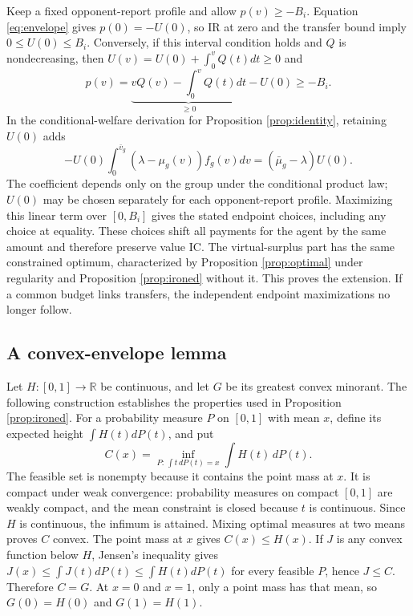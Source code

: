\documentclass[11pt]{article}
\begin{document}
Keep a fixed opponent-report profile and allow $p(v)\ge-B_i$. Equation \eqref{eq:envelope} gives $p(0)=-U(0)$, so IR at zero and the transfer bound imply $0\le U(0)\le B_i$. Conversely, if this interval condition holds and $Q$ is nondecreasing, then $U(v)=U(0)+\int_0^vQ(t)dt\ge0$ and
\[
p(v)=\underbrace{vQ(v)-\int_0^vQ(t)dt}_{\ge0}-U(0)\ge-B_i.
\]
In the conditional-welfare derivation for Proposition \ref{prop:identity}, retaining $U(0)$ adds
\[
-U(0)\int_0^{\bar v_g}(\lambda-\mu_g(v))f_g(v)dv
=(\bar\mu_g-\lambda)U(0).
\]
The coefficient depends only on the group under the conditional product law; $U(0)$ may be chosen separately for each opponent-report profile. Maximizing this linear term over $[0,B_i]$ gives the stated endpoint choices, including any choice at equality. These choices shift all payments for the agent by the same amount and therefore preserve value IC. The virtual-surplus part has the same constrained optimum, characterized by Proposition \ref{prop:optimal} under regularity and Proposition \ref{prop:ironed} without it. This proves the extension. If a common budget links transfers, the independent endpoint maximizations no longer follow.

\subsection{A convex-envelope lemma}\label{app:convex}

Let $H:[0,1]\to\mathbb R$ be continuous, and let $G$ be its greatest convex minorant. The following construction establishes the properties used in Proposition \ref{prop:ironed}. For a probability measure $P$ on $[0,1]$ with mean $x$, define its expected height $\int H(t)dP(t)$, and put
\begin{equation}\label{eq:convexconstruction}
C(x)=\inf_{P:\,\int t\,dP(t)=x}\int H(t)\,dP(t).
\end{equation}
The feasible set is nonempty because it contains the point mass at $x$. It is compact under weak convergence: probability measures on compact $[0,1]$ are weakly compact, and the mean constraint is closed because $t$ is continuous. Since $H$ is continuous, the infimum is attained. Mixing optimal measures at two means proves $C$ convex. The point mass at $x$ gives $C(x)\le H(x)$. If $J$ is any convex function below $H$, Jensen's inequality gives $J(x)\le\int J(t)dP(t)\le\int H(t)dP(t)$ for every feasible $P$, hence $J\le C$. Therefore $C=G$. At $x=0$ and $x=1$, only a point mass has that mean, so $G(0)=H(0)$ and $G(1)=H(1)$.
\end{document}
